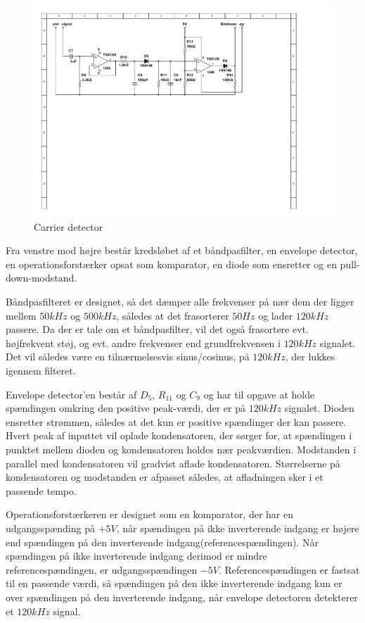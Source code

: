 \begin{figure}[h]
	\centering
	\includegraphics[width=\textwidth, trim=40 340 240 40, clip=true]{../Projektdokumentation/HardwareDesign/Diagrammer/CarrierDetector.pdf}
	\caption{Carrier detector}
	\label{fig:CarDetek}
\end{figure}

Fra venstre mod højre består kredsløbet af et båndpasfilter, en envelope detector, en operationsforstærker\cite{lib:TS912} opsat som komparator, en diode som ensretter og en pull-down-modstand.

Båndpasfilteret er designet, så det dæmper alle frekvenser på nær dem der ligger mellem $50kHz$ og $500kHz$, således at det frasorterer $50Hz$ og lader $120kHz$ passere. Da der er tale om et båndpasfilter, vil det også frasortere evt. højfrekvent støj, og evt. andre frekvenser end grundfrekvensen i $120kHz$ signalet. Det vil således være en tilnærmelsesvis sinus/cosinus, på $120kHz$, der lukkes igennem filteret.

Envelope detector'en består af $D_{5}$\cite{lib:1N4148}, $R_{11}$ og $C_{9}$ og har til opgave at holde spændingen omkring den positive peak-værdi, der er på $120kHz$ signalet. Dioden ensretter strømmen, således at det kun er positive spændinger der kan passere. Hvert peak af inputtet vil oplade kondensatoren, der sørger for, at spændingen i punktet mellem dioden og kondensatoren holdes nær peakværdien. Modstanden i parallel med kondensatoren vil gradvist aflade kondensatoren. Størrelserne på kondensatoren og modstanden er afpasset således, at afladningen sker i et passende tempo.

Operationsforstærkeren\cite{lib:TS912} er designet som en komparator, der har en udgangsspænding på $+5V$, når spændingen på ikke inverterende indgang er højere end spændingen på den inverterende indgang(referencespændingen). Når spændingen på ikke inverterende indgang derimod er mindre referencespændingen, er udgangsspændingen $-5V$. Referencespændingen er fastsat til en passende værdi, så spændingen på den ikke inverterende indgang kun er over spændingen på den inverterende indgang, når envelope detectoren detekterer et $120kHz$ signal.

